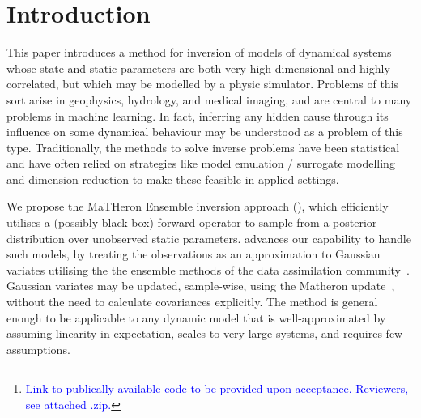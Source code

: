 \documentclass{article}
\theoremstyle{plain}
\theoremstyle{definition}
\theoremstyle{remark}
\begin{document}
\printAffiliationsAndNotice{}  %

\begin{abstract}
    A popular means of

    The cost of the resulting algorithm scales linearly with the dimension of the estimands and  does not require the calculation or storage of large covariance matrices.
    We do not require exact likelihood evaluations of the prior or posterior samples.
    However, we do require the ability to simulate from the prior, and sufficient regularity of the forward operator.
    Our method achieves orders-of-magnitude speed-up over a classical physical model inversion approach for high-dimensional models, while maintaining acceptable accuracy. This increases the dimensionality of the estimand at which inference is feasible, without resorting to dimension reduction methods.
    \footnote{\textcolor{blue}{Link to publically available code to be provided upon acceptance. Reviewers, see attached .zip.}}
\end{abstract}

\section{Introduction}
This paper introduces a method for inversion of models of dynamical systems whose state and static parameters are both very high-dimensional and highly correlated, but which may be modelled by a physic simulator.
Problems of this sort arise in geophysics, hydrology, and medical imaging, and are central to many problems in machine learning.
In fact, inferring any hidden cause through its influence on some dynamical behaviour may be understood as a problem of this type.
Traditionally, the methods to solve inverse problems have been statistical \cite{TarantolaInverse2005} and have often relied on strategies like model emulation / surrogate modelling and dimension reduction to make these feasible in applied settings.

 We propose the MaTHeron Ensemble inversion approach (\meth{}), which efficiently utilises a (possibly black-box) forward operator to sample from a posterior distribution over unobserved  static parameters.
\meth{} advances our capability to handle such models, by treating the observations as an  approximation to Gaussian variates utilising the the ensemble methods of the data assimilation community~\cite{EvensenData2009}.
Gaussian variates may be updated, sample-wise, using the Matheron update~\cite{DoucetNote2010,WilsonEfficiently2020}, without the need to calculate covariances explicitly.
The method is general enough to be applicable to any dynamic model that is well-approximated by assuming linearity in expectation, scales to very large systems, and requires few assumptions.
\end{document}
